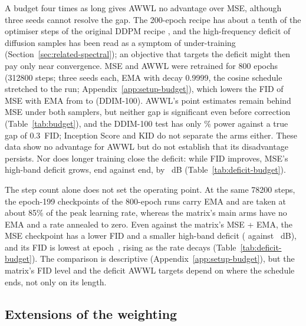 A budget four times as long gives AWWL no advantage over MSE, although three
seeds cannot resolve the gap. The 200-epoch recipe has about a tenth of the
optimiser steps of the original DDPM recipe \citep{ho2020denoising}, and the high-frequency deficit
of diffusion samples has been read as a symptom of under-training
(Section~\ref{sec:related-spectral}); an objective that targets the deficit
might then pay only near convergence. MSE and AWWL were retrained for 800
epochs (\num{312800} steps; three seeds each, EMA with decay \num{0.9999}, the
cosine schedule stretched to the run; Appendix~\ref{app:setup-budget}), which
lowers the FID of MSE with EMA from \budFIDMSEShortEmaDdim{} to
\budFIDMSELongDdim{} (DDIM-100). AWWL's point estimates remain behind MSE
under both samplers, but neither gap is significant even before correction
(Table~\ref{tab:budget}), and the DDIM-100 test has only \budPowerLong\%
power against a true gap of 0.3~FID; Inception Score and KID do not separate
the arms either. These data show no advantage for AWWL but do not establish
that its disadvantage persists. Nor does longer training close the deficit:
while FID improves, MSE's high-band deficit grows, end against end, by
\trajEndToEnd~dB (Table~\ref{tab:deficit-budget}).

The step count alone does not set the operating point. At the same
\num{78200} steps, the epoch-199 checkpoints of the 800-epoch runs carry EMA
and are taken at about 85\% of the peak learning rate, whereas the matrix's
main arms have no EMA and a rate annealed to zero. Even against the matrix's
MSE + EMA, the MSE checkpoint has a lower FID and a smaller high-band deficit
(\trajDefMSEOneNinetyNine{} against \trajDefMSEend{}~dB), and its FID is
lowest at epoch~\longBestEpochMSE{}, rising as the rate decays
(Table~\ref{tab:deficit-budget}). The comparison is descriptive
(Appendix~\ref{app:setup-budget}), but the matrix's FID level and the deficit
AWWL targets depend on where the schedule ends, not only on its length.

\subsection{Extensions of the weighting}
\label{sec:extensions}

